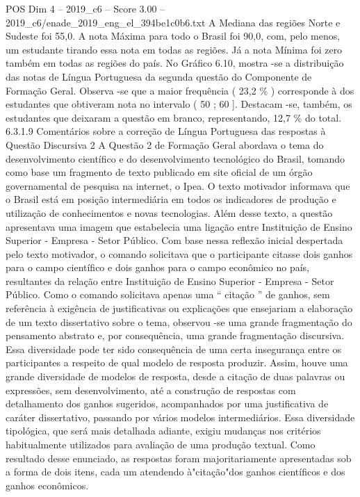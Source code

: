 \begin{textsample}{POS Dim 4 – 2019\_c6 – Score 3.00 – 2019\_c6/enade\_2019\_eng\_el\_394be1c0b6.txt}
A Mediana das regiões Norte e Sudeste foi 55,0.
A nota Máxima para todo o Brasil foi 90,0, com, pelo menos, um estudante tirando essa nota em todas as regiões.
Já a nota Mínima foi zero também em todas as regiões do país.
No Gráfico 6.10, mostra -se a distribuição das notas de Língua Portuguesa da segunda questão do Componente de Formação Geral.
Observa -se que a maior frequência ( 23,2 \% ) corresponde à dos estudantes que obtiveram nota no intervalo ( 50 ; 60 ].
Destacam -se, também, os estudantes que deixaram a questão em branco, representando, 12,7 \% do total. 6.3.1.9 Comentários sobre a correção de Língua Portuguesa das respostas à Questão Discursiva 2 A Questão 2 de Formação Geral abordava o tema do desenvolvimento científico e do desenvolvimento tecnológico do Brasil, tomando como base um fragmento de texto publicado em site oficial de um órgão governamental de pesquisa na internet, o Ipea.
O texto motivador informava que o Brasil está em posição intermediária em todos os indicadores de produção e utilização de conhecimentos e novas tecnologias.
Além desse texto, a questão apresentava uma imagem que estabelecia uma ligação entre Instituição de Ensino Superior - Empresa - Setor Público.
Com base nessa reflexão inicial despertada pelo texto motivador, o comando solicitava que o participante citasse dois ganhos para o campo científico e dois ganhos para o campo econômico no país, resultantes da relação entre Instituição de Ensino Superior - Empresa - Setor Público.
Como o comando solicitava apenas uma “ citação ” de ganhos, sem referência à exigência de justificativas ou explicações que ensejariam a elaboração de um texto dissertativo sobre o tema, observou -se uma grande fragmentação do pensamento abstrato e, por consequência, uma grande fragmentação discursiva.
Essa diversidade pode ter sido consequência de uma certa insegurança entre os participantes a respeito de qual modelo de resposta produzir.
Assim, houve uma grande diversidade de modelos de resposta, desde a citação de duas palavras ou expressões, sem desenvolvimento, até a construção de respostas com detalhamento dos ganhos sugeridos, acompanhados por uma justificativa de caráter dissertativo, passando por vários modelos intermediários.
Essa diversidade tipológica, que será mais detalhada adiante, exigiu mudanças nos critérios habitualmente utilizados para avaliação de uma produção textual.
Como resultado desse enunciado, as respostas foram majoritariamente apresentadas sob a forma de dois itens, cada um atendendo à"citação"dos ganhos científicos e dos ganhos econômicos.

\end{textsample}
